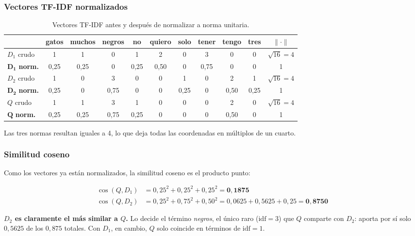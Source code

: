 \documentclass[11pt, a4paper]{article}
\begin{document}
\subsubsection{Vectores TF-IDF normalizados}

\begin{table}[H]
\centering
\caption{Vectores TF-IDF antes y después de normalizar a norma unitaria.}
\small
\renewcommand{\arraystretch}{1.2}
\begin{tabular}{@{}lcccccccccc@{}}
\toprule
& gatos & muchos & negros & no & quiero & solo & tener & tengo & tres & $\|\cdot\|$ \\
\midrule
$D_1$ crudo & 1 & 1 & 0 & 1 & 2 & 0 & 3 & 0 & 0 & $\sqrt{16}=4$ \\
$\mathbf{D_1}$ \textbf{norm.} & 0,25 & 0,25 & 0 & 0,25 & 0,50 & 0 & 0,75 & 0 & 0 & 1 \\
\midrule
$D_2$ crudo & 1 & 0 & 3 & 0 & 0 & 1 & 0 & 2 & 1 & $\sqrt{16}=4$ \\
$\mathbf{D_2}$ \textbf{norm.} & 0,25 & 0 & 0,75 & 0 & 0 & 0,25 & 0 & 0,50 & 0,25 & 1 \\
\midrule
$Q$ crudo & 1 & 1 & 3 & 1 & 0 & 0 & 0 & 2 & 0 & $\sqrt{16}=4$ \\
$\mathbf{Q}$ \textbf{norm.} & 0,25 & 0,25 & 0,75 & 0,25 & 0 & 0 & 0 & 0,50 & 0 & 1 \\
\bottomrule
\end{tabular}
\end{table}

Las tres normas resultan iguales a 4, lo que deja todas las coordenadas en múltiplos de un cuarto.

\subsubsection{Similitud coseno}

Como los vectores ya están normalizados, la similitud coseno es el producto punto:

\begin{align}
\cos(Q, D_1) &= 0{,}25^2 + 0{,}25^2 + 0{,}25^2 = \mathbf{0{,}1875} \\
\cos(Q, D_2) &= 0{,}25^2 + 0{,}75^2 + 0{,}50^2 = 0{,}0625 + 0{,}5625 + 0{,}25 = \mathbf{0{,}8750}
\end{align}

\textbf{$D_2$ es claramente el más similar a $Q$.} Lo decide el término \textit{negros}, el único
raro ($\mathrm{idf} = 3$) que $Q$ comparte con $D_2$: aporta por sí solo $0{,}5625$ de los $0{,}875$
totales. Con $D_1$, en cambio, $Q$ solo coincide en términos de $\mathrm{idf} = 1$.
\end{document}
